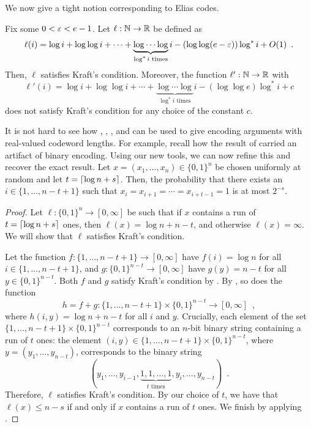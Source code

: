 \documentclass{patmorin}
\newenvironment{customthm}[1]
  {\renewcommand\theinnercustomthm{#1}\innercustomthm}
  {\endinnercustomthm}
\begin{document}
We now give a tight notion corresponding to Elias codes.
\begin{thm}
  Fix some $0 < \varepsilon < e - 1$. Let $\ell : \mathbb{N} \to \mathbb{R}$ be defined as
  \[
  \ell(i) = \log i + \log \log i + \cdots + \underbrace{\log \cdots
    \log}_{\text{$\log^* i$ times}} i - (\log \log (e - \varepsilon)) \log^*
  i + O(1) \enspace .
  \]
  Then, $\ell$ satisfies Kraft's condition. Moreover, the function
  $\ell' : \mathbb{N} \to \mathbb{R}$ with
  \[
  \ell'(i) = \log i + \log \log i + \cdots + \underbrace{\log \cdots
    \log}_{\text{$\log^* i$ times}} i - (\log \log e) \log^* i + c
  \]
  does not satisfy Kraft's condition for any choice of the constant
  $c$.
\end{thm}

It is not hard to see how , ,
, and  can be used to
give encoding arguments with real-valued codeword lengths. For
example, recall how the result of  carried an artifact
of binary encoding. Using our new tools, we can now refine this and
recover the exact result.
\begin{customthm}{\ref*{thm:runs-i}b}
  Let $x=(x_1,\ldots,x_n)\in\{0,1\}^n$ be chosen uniformly at random
  and let $t = {\lceil \log n + s \rceil}$. Then, the probability that there
  exists an $i\in\{1,\ldots,n-t+1\}$ such that
  $x_i=x_{i+1}=\cdots=x_{i+t-1}=1$ is at most $2^{-s}$.
\end{customthm}
\begin{proof}
  Let $\ell : \{0, 1\}^n \to [0, \infty]$ be such that if $x$ contains
  a run of $t = {\lceil \log n + s \rceil}$ ones, then
  $\ell(x) = \log n + n - t$, and otherwise $\ell(x) = \infty$. We
  will show that $\ell$ satisfies Kraft's condition.


  Let the function $f : \{1, \ldots, n - t + 1\} \to [0, \infty]$ have
  $f(i) = \log n$ for all $i \in \{1, \dots, n - t + 1\}$, and
  $g : \{0, 1\}^{n - t} \to [0, \infty]$ have $g(y) = n - t$ for all
  $y \in \{0, 1\}^{n - t}$. Both $f$ and $g$ satisfy Kraft's condition by
  . By , so does
  the function
  \[
    h = f + g : \{1, \ldots, n - t + 1\} \times \{0, 1\}^{n - t} \to
    [0, \infty] \enspace ,
  \]
  where $h(i, y) = \log n + n - t$ for all $i$ and $y$. Crucially,
  each element of the set $\{1, \ldots, n - t + 1\} \times \{0, 1\}^{n
    - t}$ corresponds to an $n$-bit binary string containing a run of
  $t$ ones: the element $(i, y) \in \{1, \ldots, n - t + 1\} \times
  \{0, 1\}^{n - t}$, where $y = (y_1, \ldots, y_{n - t})$, corresponds
  to the binary string
  \[
  (y_1, \dots, y_{i - 1}, \underbrace{1, 1, \dots, 1}_{\text{$t$ times}},
  y_i, \dots, y_{n - t}) \enspace .
  \]
  Therefore, $\ell$ satisfies Kraft's condition. By our choice of
  $t$, we have that $\ell(x) \leq n - s$ if and only if $x$ contains a
  run of $t$ ones. We finish by applying .
\end{proof}
\end{document}
